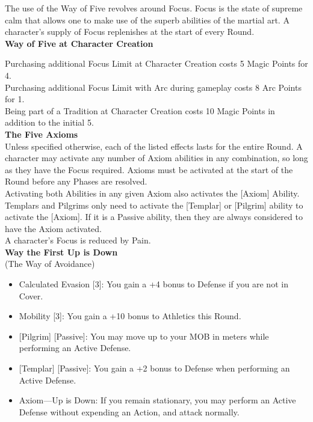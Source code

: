 \documentclass[a4paper, twocolumn, openany]{book}
\begin{document}
{The use of the Way of Five revolves around Focus. Focus is the state of supreme calm that allows one to
make use of the superb abilities of the martial art. A character’s supply of Focus replenishes at the start of
every Round.\\

{\bfseries Way of Five at Character Creation\\}

Purchasing additional Focus Limit at Character Creation costs 5 Magic Points for 4.\\
Purchasing additional Focus Limit with Arc during gameplay costs 8 Arc Points for 1.\\
Being part of a Tradition at Character Creation costs 10 Magic Points in addition to the initial 5.\\

{\bfseries\large The Five Axioms\\}
Unless specified otherwise, each of the listed effects lasts for the entire Round. A character may activate
any number of Axiom abilities in any combination, so long as they have the Focus required. Axioms must be
activated at the start of the Round before any Phases are resolved.\\
Activating both Abilities in any given Axiom also activates the [Axiom] Ability.\\
Templars and Pilgrims only need to activate the [Templar] or [Pilgrim] ability to activate the [Axiom]. If it is a
Passive ability, then they are always considered to have the Axiom activated.\\

A character's Focus is reduced by Pain.\\

{\bfseries Way the First Up is Down\\}
(The Way of Avoidance)\\
\begin{itemize}
\item Calculated Evasion [3]: You gain a +4 bonus to Defense if you are not in Cover.
\item Mobility [3]: You gain a +10 bonus to Athletics this Round.
\item {[}Pilgrim{]} [Passive]: You may move up to your MOB in meters while performing an Active Defense.
\item {[}Templar{]} [Passive]: You gain a +2 bonus to Defense when performing an Active Defense.
\item Axiom—Up is Down: If you remain stationary, you may perform an Active Defense without expending an Action, and attack normally.\\[\baselineskip]
\end{itemize}

}
\end{document}
